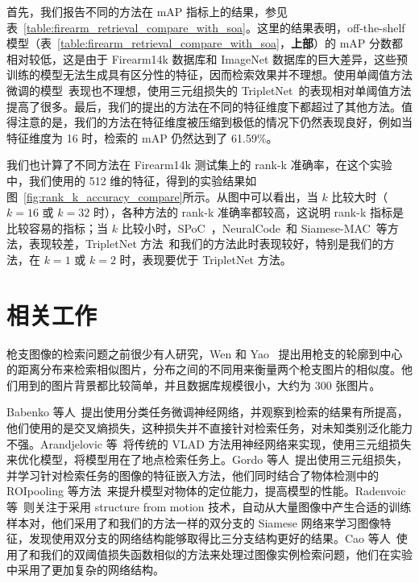 首先，我们报告不同的方法在 mAP 指标上的结果，参见表~\ref{table:firearm_retrieval_compare_with_soa}。这里的结果表明，off-the-shelf 模型（表~\ref{table:firearm_retrieval_compare_with_soa}，\textbf{上部}）的 mAP 分数都相对较低，这是由于 Firearm14k 数据库和 ImageNet 数据库的巨大差异，这些预训练的模型无法生成具有区分性的特征，因而检索效果并不理想。使用单阈值方法微调的模型~\cite{Radenovic2016CNNIR}表现也不理想，使用三元组损失的 TripletNet~\cite{Gordo2016DeepIR}的表现相对单阈值方法提高了很多。最后，我们的提出的方法在不同的特征维度下都超过了其他方法。值得注意的是，我们的方法在特征维度被压缩到极低的情况下仍然表现良好，例如当特征维度为 16 时，检索的 mAP 仍然达到了 61.59\%。

我们也计算了不同方法在 Firearm14k 测试集上的 rank-k 准确率，在这个实验中，我们使用的 512 维的特征，得到的实验结果如图~\ref{fig:rank_k_accuracy_compare}所示。从图中可以看出，当 $k$ 比较大时（$k=16$ 或 $k=32$ 时），各种方法的 rank-k 准确率都较高，这说明 rank-k 指标是比较容易的指标；当 $k$ 比较小时，SPoC~\cite{Babenko2015AggregatingLD}，NeuralCode~\cite{Babenko2014NeuralCF}和 Siamese-MAC~\cite{Radenovic2016CNNIR}等方法，表现较差，TripletNet 方法~\cite{Gordo2016DeepIR}和我们的方法此时表现较好，特别是我们的方法，在 $k=1$ 或 $k=2$ 时，表现要优于 TripletNet 方法。

\section{相关工作}\label{sec:double_margin_related_work}
枪支图像的检索问题之前很少有人研究，Wen 和 Yao ~\cite{Wen2005PistolIR}提出用枪支的轮廓到中心的距离分布来检索相似图片，分布之间的不同用来衡量两个枪支图片的相似度。他们用到的图片背景都比较简单，并且数据库规模很小，大约为 300 张图片。

Babenko 等人~\cite{Babenko2014NeuralCF}提出使用分类任务微调神经网络，并观察到检索的结果有所提高，他们使用的是交叉熵损失，这种损失并不直接针对检索任务，对未知类别泛化能力不强。Arandjelovic 等~\cite{Arandjelovic2016NetVLADCA}将传统的 VLAD 方法用神经网络来实现，使用三元组损失来优化模型，将模型用在了地点检索任务上。Gordo 等人~\cite{Gordo2016DeepIR}提出使用三元组损失，并学习针对检索任务的图像的特征嵌入方法，他们同时结合了物体检测中的 ROIpooling 等方法~\cite{Ren2017FasterRT}来提升模型对物体的定位能力，提高模型的性能。Radenvoic 等~\cite{Radenovic2016CNNIR}则关注于采用 structure from motion 技术，自动从大量图像中产生合适的训练样本对，他们采用了和我们的方法一样的双分支的 Siamese 网络来学习图像特征，发现使用双分支的网络结构能够取得比三分支结构更好的结果。Cao 等人~\cite{Cao2016QuartetnetLF}使用了和我们的双阈值损失函数相似的方法来处理过图像实例检索问题，他们在实验中采用了更加复杂的网络结构。

